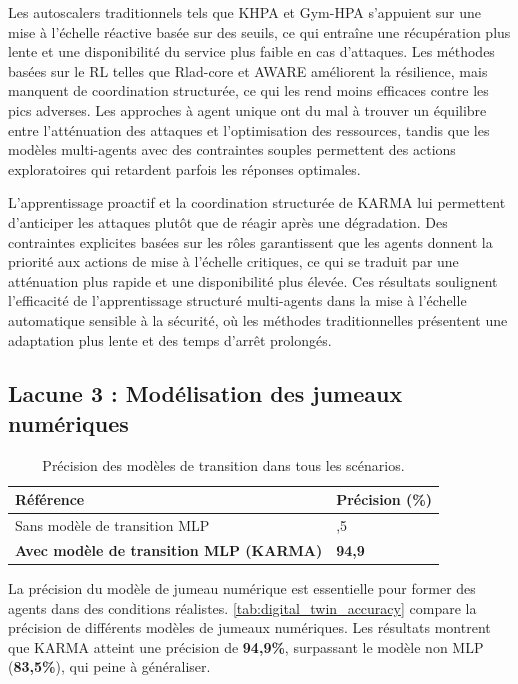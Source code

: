 Les autoscalers traditionnels tels que KHPA et Gym-HPA s'appuient sur une mise à l'échelle réactive basée sur des seuils, ce qui entraîne une récupération plus lente et une disponibilité du service plus faible en cas d'attaques. Les méthodes basées sur le RL telles que Rlad-core et AWARE améliorent la résilience, mais manquent de coordination structurée, ce qui les rend moins efficaces contre les pics adverses. Les approches à agent unique ont du mal à trouver un équilibre entre l'atténuation des attaques et l'optimisation des ressources, tandis que les modèles multi-agents avec des contraintes souples permettent des actions exploratoires qui retardent parfois les réponses optimales.

L'apprentissage proactif et la coordination structurée de KARMA lui permettent d'anticiper les attaques plutôt que de réagir après une dégradation. Des contraintes explicites basées sur les rôles garantissent que les agents donnent la priorité aux actions de mise à l'échelle critiques, ce qui se traduit par une atténuation plus rapide et une disponibilité plus élevée. Ces résultats soulignent l'efficacité de l'apprentissage structuré multi-agents dans la mise à l'échelle automatique sensible à la sécurité, où les méthodes traditionnelles présentent une adaptation plus lente et des temps d'arrêt prolongés.


\subsection{Lacune 3 : Modélisation des jumeaux numériques}

\begin{table}[h]
  \centering
  \caption{Précision des modèles de transition dans tous les scénarios.}
  \label{tab:digital_twin_accuracy}

  {
    \footnotesize
    \begin{tabular}{>{\raggedright\arraybackslash}m{6cm}>{\centering\arraybackslash}m{2cm}}
      \hline
      \textbf{Référence}                             & \textbf{Précision (\%)} \\
      \hline
      Sans modèle de transition MLP                  & 83,5                    \\
      \textbf{Avec modèle de transition MLP (KARMA)} & \textbf{94,9}           \\
      \hline
    \end{tabular}}
\end{table}
%
La précision du modèle de jumeau numérique est essentielle pour former des agents dans des conditions réalistes.
\autoref{tab:digital_twin_accuracy} compare la précision de différents modèles de jumeaux numériques. Les résultats montrent que KARMA atteint une précision de \textbf{94,9\%}, surpassant le modèle non MLP (\textbf{83,5\%}), qui peine à généraliser.


